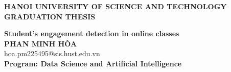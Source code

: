 \documentclass[main.tex]{subfiles}
\begin{document}
\begin{titlepage}
\thispagestyle{empty}
\begin{center}

{\textbf{\large{HANOI UNIVERSITY OF SCIENCE AND TECHNOLOGY}}}\\[4cm]

{\textbf{\huge{GRADUATION THESIS}}}\\[1cm]
{\textbf{\Large{Student's engagement detection in online classes}}\\[1cm]

{\textbf{\large{PHAN MINH HÒA}}}\\
{\large{hoa.pm225495@sis.hust.edu.vn}}\\[0.5cm]

{\textbf{\large{Program: Data Science and Artificial Intelligence
}}}\\

\vspace{4cm}
\begin{table}[H]
\centering
{}
\end{table}}
\end{center}



\end{titlepage}
\end{document}

